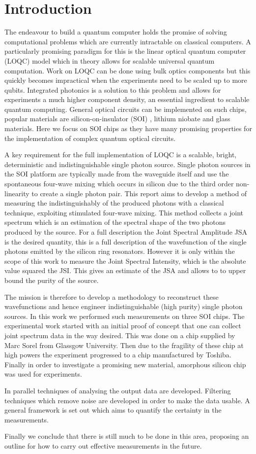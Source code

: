 \newpage
\section{Introduction}
The endeavour to build a quantum computer holds the promise of solving computational problems which are currently intractable on classical computers. A particularly promising paradigm for this is the linear optical quantum computer (LOQC) model which in theory allows for scalable universal quantum computation. Work on LOQC can be done using bulk optics components but this quickly becomes impractical when the experiments need to be scaled up to more qubits. Integrated photonics is a solution to this problem and allows for experiments a much higher component density, an essential ingredient to scalable quantum computing. General optical circuits can be implemented on such chips, popular materials are silicon-on-insulator (SOI) , lithium niobate and glass materials. Here we focus on SOI chips as they have many promising properties for the implementation of complex quantum optical circuits.

A key requirement for the full implementation of LOQC is a scalable, bright, deterministic and indistinguishable single photon source. Single photon sources in the SOI platform are typically made from the waveguide itself and use the spontaneous four-wave mixing which occurs in silicon due to the third order non-linearity to create a single photon pair. This report aims to develop a method of measuring the indistinguishably of the produced photons with a classical technique, exploiting stimulated four-wave mixing. This method collects a joint spectrum which is an estimation of the spectral shape of the two photons produced by the source. For a full description the Joint Spectral Amplitude JSA is the desired quantity, this is a full description of the wavefunction of the single photons emitted by the silicon ring resonators. However it is only within the scope of this work to measure the Joint Spectral Intensity, which is the absolute value squared the JSI. This gives an estimate of the JSA and allows to to upper bound the purity of the source.

The mission is therefore to develop a methodology to reconstruct these wavefunctions and hence engineer indistinguishable (high purity) single photon sources. In this work we performed such measurements on three SOI chips. The experimental work started with an initial proof of concept that one can collect joint spectrum data in the way desired. This was done on a chip supplied by Marc Sorel from Glassgow University. Then due to the fragility of these chip at high powers the experiment progressed to a chip manufactured by Toshiba. Finally in order to investigate a promising new material, amorphous silicon chip was used for experiments. 

In parallel techniques of analysing the output data are developed. Filtering techniques which remove noise are developed in order to make the data usable. A general framework is set out which aims to quantify the certainty in the measurements.

Finally we conclude that there is still much to be done in this area, proposing an outline for how to carry out effective measurements in the future.


